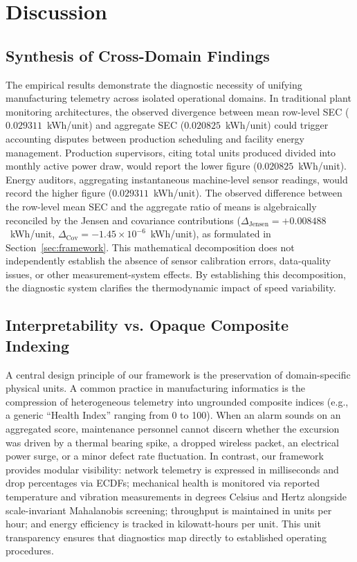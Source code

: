 \documentclass[journal]{IEEEtran}
\begin{document}
\section{Discussion}
\label{sec:discussion}

\subsection{Synthesis of Cross-Domain Findings}
The empirical results demonstrate the diagnostic necessity of unifying manufacturing telemetry across isolated operational domains. In traditional plant monitoring architectures, the observed divergence between mean row-level SEC ($0.029311$~kWh/unit) and aggregate SEC ($0.020825$~kWh/unit) could trigger accounting disputes between production scheduling and facility energy management. Production supervisors, citing total units produced divided into monthly active power draw, would report the lower figure ($0.020825$~kWh/unit). Energy auditors, aggregating instantaneous machine-level sensor readings, would record the higher figure ($0.029311$~kWh/unit). The observed difference between the row-level mean SEC and the aggregate ratio of means is algebraically reconciled by the Jensen and covariance contributions ($\Delta_{\text{Jensen}} = +0.008488$~kWh/unit, $\Delta_{\text{Cov}} = -1.45 \times 10^{-6}$~kWh/unit), as formulated in Section~\ref{sec:framework}. This mathematical decomposition does not independently establish the absence of sensor calibration errors, data-quality issues, or other measurement-system effects. By establishing this decomposition, the diagnostic system clarifies the thermodynamic impact of speed variability.

\subsection{Interpretability vs. Opaque Composite Indexing}
A central design principle of our framework is the preservation of domain-specific physical units. A common practice in manufacturing informatics is the compression of heterogeneous telemetry into ungrounded composite indices (e.g., a generic ``Health Index'' ranging from 0 to 100). When an alarm sounds on an aggregated score, maintenance personnel cannot discern whether the excursion was driven by a thermal bearing spike, a dropped wireless packet, an electrical power surge, or a minor defect rate fluctuation. In contrast, our framework provides modular visibility: network telemetry is expressed in milliseconds and drop percentages via ECDFs; mechanical health is monitored via reported temperature and vibration measurements in degrees Celsius and Hertz alongside scale-invariant Mahalanobis screening; throughput is maintained in units per hour; and energy efficiency is tracked in kilowatt-hours per unit. This unit transparency ensures that diagnostics map directly to established operating procedures.
\end{document}
